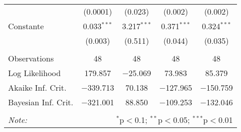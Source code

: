 \begin{table}[!htbp]
\begin{tabular}{@{\extracolsep{5pt}}lcccc}
  & (0.0001) & (0.023) & (0.002) & (0.002) \\
  Constante & 0.033$^{***}$ & 3.217$^{***}$ & 0.371$^{***}$ & 0.324$^{***}$ \\
  & (0.003) & (0.511) & (0.044) & (0.035) \\
 \hline \\[-1.8ex]
Observations & 48 & 48 & 48 & 48 \\
Log Likelihood & 179.857 & $-$25.069 & 73.983 & 85.379 \\
Akaike Inf. Crit. & $-$339.713 & 70.138 & $-$127.965 & $-$150.759 \\
Bayesian Inf. Crit. & $-$321.001 & 88.850 & $-$109.253 & $-$132.046 \\
\hline
\hline \\[-1.8ex]
\textit{Note:}  & \multicolumn{4}{r}{$^{*}$p$<$0.1; $^{**}$p$<$0.05; $^{***}$p$<$0.01} \\
\end{tabular}
\end{table}

